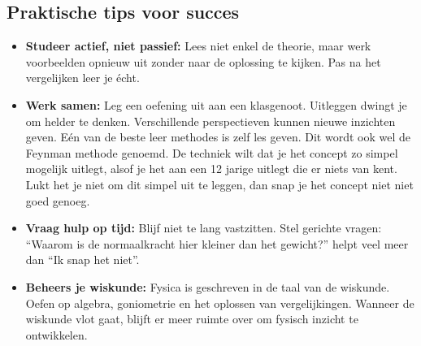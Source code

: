 \documentclass{ximera}
\begin{document}

 \subsection{Praktische tips voor succes}
  

\begin{itemize}
  \item \textbf{Studeer actief, niet passief:}  
  Lees niet enkel de theorie, maar werk voorbeelden opnieuw uit zonder naar de oplossing te kijken.  
  Pas na het vergelijken leer je écht.

  \item \textbf{Werk samen:}  
  Leg een oefening uit aan een klasgenoot. Uitleggen dwingt je om helder te denken.  
  Verschillende perspectieven kunnen nieuwe inzichten geven. Eén van de beste leer methodes is zelf les geven. Dit wordt ook wel de Feynman methode genoemd. De techniek wilt dat je het concept zo simpel mogelijk uitlegt, alsof je het aan een 12 jarige uitlegt die er niets van kent. Lukt het je niet om dit simpel uit te leggen, dan snap je het concept niet niet goed genoeg.
 
  \item \textbf{Vraag hulp op tijd:}  
  Blijf niet te lang vastzitten. Stel gerichte vragen:  
  “Waarom is de normaalkracht hier kleiner dan het gewicht?” helpt veel meer dan “Ik snap het niet”.

  \item \textbf{Beheers je wiskunde:}  
Fysica is geschreven in de taal van de wiskunde.
Oefen op algebra, goniometrie en het oplossen van vergelijkingen.
Wanneer de wiskunde vlot gaat, blijft er meer ruimte over om fysisch inzicht te ontwikkelen.


\end{itemize}
\end{document}
